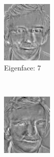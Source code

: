 \documentclass[12pt]{article}
\begin{document}
\begin{figure}
\begin{subfigure}[b]{0.20\textwidth}
		\includegraphics[width=\textwidth]{Task4.3_Images/PrincipalComponent7.jpg}
		\caption{Eigenface: 7}
	\end{subfigure}\\
	\begin{subfigure}[b]{0.20\textwidth}
		\includegraphics[width=\textwidth]{Task4.3_Images/PrincipalComponent8.jpg}

\end{subfigure}
\end{figure}
\end{document}
